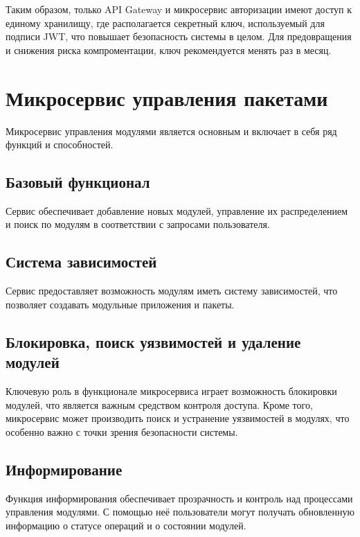 


Таким образом, только API Gateway и микросервис авторизации имеют доступ к единому хранилищу, где располагается секретный ключ, используемый для подписи JWT, что повышает безопасность системы в целом. Для предовращения и снижения риска компроментации, ключ рекомендуется менять раз в месяц. 

\section{Микросервис управления пакетами}

Микросервис управления модулями является основным и включает в себя ряд функций и способностей. 

\subsection{Базовый функционал}
Сервис обеспечивает добавление новых модулей, управление их распределением и поиск по модулям в соответствии с запросами пользователя.

\subsection{Система зависимостей}
Сервис предоставляет возможность модулям иметь систему зависимостей, что позволяет создавать модульные приложения и пакеты.

\subsection{Блокировка, поиск уязвимостей и удаление модулей}
Ключевую роль в функционале микросервиса играет возможность блокировки модулей, что является важным средством контроля доступа. Кроме того, микросервис может производить поиск и устранение уязвимостей в модулях, что особенно важно с точки зрения безопасности системы.

\subsection{Информирование}
Функция информирования обеспечивает прозрачность и контроль над процессами управления модулями. С помощью неё пользователи могут получать обновленную информацию о статусе операций и о состоянии модулей.

